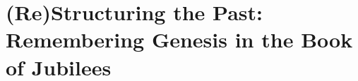 
\chapter{(Re)Structuring the Past: Remembering Genesis in the Book of Jubilees}
\label{chap:jubilees}




